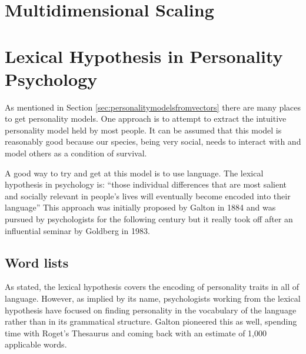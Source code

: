 \documentclass[eric_thesis.tex]{subfiles}
\begin{document}
\section{Multidimensional Scaling}


\section{Lexical Hypothesis in Personality Psychology}

As mentioned in Section \ref{sec:personalitymodelsfromvectors} there are many
places to get personality models. One approach is to attempt to extract the 
intuitive personality model held by most people. It can be assumed that this
model is reasonably good because our species, being very social, needs to 
interact with and model others as a condition of survival. 

A good way to try and get at this model is to use language. The lexical 
hypothesis in psychology is:
``those individual differences that are most salient and socially relevant in
people's lives will eventually become encoded into their language'' 
 This approach was initially proposed by 
Galton in 1884  and was pursued by psychologists for the following century
but it really took off after an influential seminar
by Goldberg in 1983.  

\subsection{Word lists}

As stated, the lexical hypothesis covers the encoding of personality traits in
all of language. However, as implied by its name, psychologists working from 
the lexical hypothesis have focused on finding personality in the vocabulary
of the language rather than in its grammatical structure. Galton pioneered this
as well, spending time with Roget's Thesaurus and coming back with an estimate
of 1,000 applicable words.  
\end{document}
